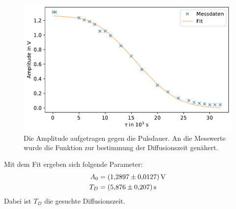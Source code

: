 \begin{figure}[ht]
    \center
    \includegraphics[scale = 0.75]{plots/df2_2.pdf}
    \caption{Die Amplitude aufgetragen gegen die Pulsdauer. An die Messwerte wurde die Funktion zur bestimmung der Diffusionszeit genähert.}
    \label{fig:df2_2}
\end{figure}
Mit dem Fit ergeben sich folgende Parameter:
\begin{align*}
    A_0 &= \SI{1.2897 +- 0.0127}{\volt}\\
    T_D &= \SI{5.876 +- 0.207}{\second}
\end{align*}
Dabei ist $T_D$ die gesuchte Diffusionszeit.

